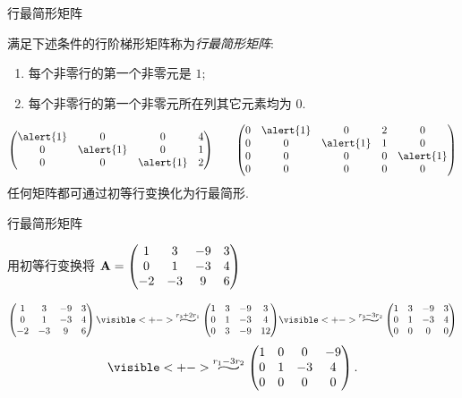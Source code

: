 \begin{frame}{行最简形矩阵}
	\onslide<+->
	\begin{definition}
		满足下述条件的行阶梯形矩阵称为\emph{行最简形矩阵}:
		\begin{enumerate}
			\item 每个非零行的第一个非零元是 $1$;
			\item 每个非零行的第一个非零元所在列其它元素均为 $0$.
		\end{enumerate}
	\end{definition}
	\onslide<+->
	\[\begin{pmatrix}
		\alert{1}&0&0&4\\
		0&\alert{1}&0&1\\
		0&0&\alert{1}&2
	\end{pmatrix}
	\qquad\begin{pmatrix}
		0&\alert{1}&0&2&0\\
		0&0&\alert{1}&1&0\\
		0&0&0&0&\alert{1}\\
		0&0&0&0&0
	\end{pmatrix}\]
	\onslide<+->
	任何矩阵都可通过初等行变换化为行最简形.
\end{frame}


\begin{frame}{行最简形矩阵}
	\onslide<+->
	\begin{example}
		用初等行变换将 ${\mathbf{A}}=\begin{pmatrix}
			1&3&-9&3\\
			0&1&-3&4\\
			-2&-3&9&6
		\end{pmatrix}$
	\end{example}
	\onslide<+->
	\begin{solution}
		\[\begin{pmatrix}
			1&3&-9&3\\
			0&1&-3&4\\
			-2&-3&9&6
		\end{pmatrix}
		\visible<+->{\wsim{r_3+2r_1}{}\begin{pmatrix}
			1&3&-9&3\\
			0&1&-3&4\\
			0&3&-9&12
		\end{pmatrix}}
		\visible<+->{\wsim{
			r_3-3r_2}{}\begin{pmatrix}
				1&3&-9&3\\
				0&1&-3&4\\
				0&0&0&0
		\end{pmatrix}}\]\[
		\visible<+->{\wsim{
			r_1-3r_2}{}\begin{pmatrix}
				1&0&0&-9\\
				0&1&-3&4\\
				0&0&0&0
		\end{pmatrix}.}
		\]
	\end{solution}
\end{frame}

